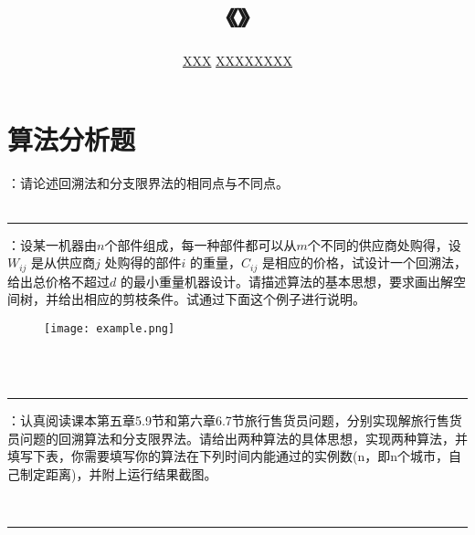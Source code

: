 \documentclass[UTF8,16pt]{article} %
\title{《\heiti{算法设计与分析}》\heiti{第{\color{red}5}次作业}}
\author{\kaishu{姓名：}\underline{XXX} \quad\quad\quad\quad\quad  \kaishu{学号：}\underline{XXXXXXXX}}
\date{}
\begin{document}
	
\maketitle
\vbox{} %

\section*{\textbf{算法分析题}}
：请论述回溯法和分支限界法的相同点与不同点。\\
{}\\
\rule[0pt]{14.3cm}{0.05em}

\vbox{} %
：设某一机器由$n$个部件组成，每一种部件都可以从$m$个不同的供应商处购得，设$W_{ij}$ 是从供应商$j$ 处购得的部件$i$ 的重量，$C_{ij}$ 是相应的价格，试设计一个回溯法，给出总价格不超过$d$ 的最小重量机器设计。请描述算法的基本思想，要求画出解空间树，并给出相应的剪枝条件。试通过下面这个例子进行说明。
\begin{figure}[htbp]
	\centering
	\texttt{[image: example.png]}
\end{figure}\\
{}\\
\rule[0pt]{14.3cm}{0.05em}

\vbox{} %
：认真阅读课本第五章5.9节和第六章6.7节旅行售货员问题，分别实现解旅行售货员问题的回溯算法和分支限界法。请给出两种算法的具体思想，实现两种算法，并填写下表，你需要填写你的算法在下列时间内能通过的实例数(n，即n个城市，自己制定距离)，并附上运行结果截图。\\
\begin{table}[]
	\caption{通过实例数}
	\label{tab:my-table}
\end{table}
{}\\
\rule[0pt]{14.3cm}{0.05em}
\end{document}
